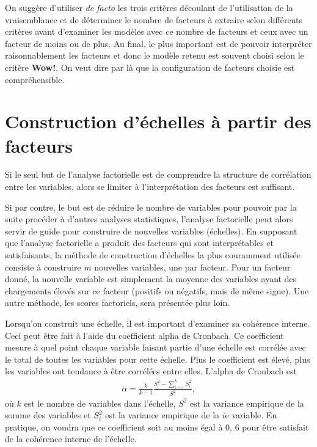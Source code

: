 \documentclass[
  11pt,
  letterpaper,
]{book}
\theoremstyle{definition}
\theoremstyle{definition}
\theoremstyle{definition}
\theoremstyle{definition}
\theoremstyle{remark}
\begin{document}
On suggère d'utiliser \emph{de facto} les trois critères découlant de l'utilisation de la vraisemblance et de déterminer le nombre de facteurs à extraire selon différents critères avant d'examiner les modèles avec ce nombre de facteurs et ceux
avec un facteur de moins ou de plus. Au final, le plus important est de pouvoir interpréter raisonnablement les facteurs et donc le modèle retenu est souvent choisi selon le critère \textbf{Wow!}. On veut dire par là que la configuration de facteurs choisie est compréhensible.

\hypertarget{construction-duxe9chelles-uxe0-partir-des-facteurs}{%
\section{Construction d'échelles à partir des facteurs}\label{construction-duxe9chelles-uxe0-partir-des-facteurs}}

Si le seul but de l'analyse factorielle est de comprendre la structure de corrélation entre les variables, alors se limiter à l'interprétation des facteurs est suffisant.

Si par contre, le but est de réduire le nombre de variables pour pouvoir par la suite procéder à d'autres analyses statistiques, l'analyse factorielle peut alors servir de guide pour construire de nouvelles variables (échelles). En supposant que l'analyse factorielle a produit des facteurs qui sont interprétables et satisfaisants, la méthode de construction d'échelles la plus couramment utilisée consiste à construire \(m\) nouvelles variables, une par facteur. Pour un facteur donné, la nouvelle variable est simplement la moyenne des variables ayant des chargements élevés sur ce facteur (positifs ou négatifs, mais de même signe). Une autre méthode, les scores factoriels, sera présentée plus loin.

Lorsqu'on construit une échelle, il est important d'examiner sa cohérence interne. Ceci peut être fait à l'aide du coefficient alpha de Cronbach. Ce coefficient mesure à quel point chaque variable faisant partie d'une échelle est corrélée avec le total de toutes les variables pour cette échelle.
Plus le coefficient est élevé, plus les variables ont tendance à être corrélées entre elles. L'alpha de Cronbach est
\begin{align*}
\alpha=\frac{k}{k-1} \frac{S^2-\sum_{i=1}^k S_i^2}{S^2}, 
\end{align*}
où \(k\) est le nombre de variables dans l'échelle, \(S^2\) est la variance empirique de la somme des variables et \(S_i^2\) est la variance empirique de la \(i\)e variable. En pratique, on voudra que ce coefficient soit au moins égal à 0, 6 pour être satisfait de la cohérence interne de l'échelle.
\end{document}
